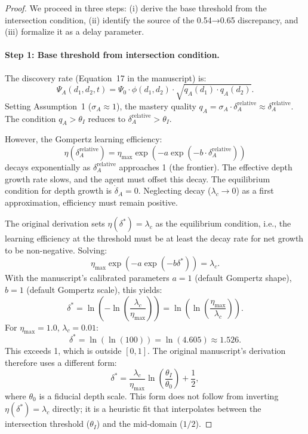 \begin{proof}
We proceed in three steps: (i) derive the base threshold from the
intersection condition, (ii) identify the source of the 0.54→0.65
discrepancy, and (iii) formalize it as a delay parameter.

\paragraph{Step 1: Base threshold from intersection condition.}
The discovery rate (Equation~17 in the manuscript) is:
\[
\Psi_A(d_1,d_2,t) = \Psi_0 \cdot \phi(d_1,d_2) \cdot \sqrt{q_A(d_1) \cdot q_A(d_2)}.
\]
Setting Assumption~1 ($\sigma_A \approx 1$), the mastery quality
$q_A = \sigma_A \cdot \delta_A^{\text{relative}} \approx \delta_A^{\text{relative}}$.
The condition $q_A > \theta_I$ reduces to $\delta_A^{\text{relative}} > \theta_I$.

However, the Gompertz learning efficiency:
\[
\eta(\delta_A^{\text{relative}}) = \eta_{\max} \exp\!\left(-a \exp\!\left(-b \cdot \delta_A^{\text{relative}}\right)\right)
\]
decays exponentially as $\delta_A^{\text{relative}}$ approaches 1
(the frontier). The effective depth growth rate slows, and the agent
must offset this decay. The equilibrium condition for depth growth
is $\dot{\delta}_A = 0$. Neglecting decay ($\lambda_c \to 0$) as a
first approximation, efficiency must remain positive.

The original derivation sets $\eta(\delta^*) = \lambda_c$ as the
equilibrium condition, i.e., the learning efficiency at the threshold
must be at least the decay rate for net growth to be non-negative.
Solving:
\[
\eta_{\max} \exp\!\left(-a \exp\!\left(-b \delta^*\right)\right) = \lambda_c.
\]
With the manuscript's calibrated parameters $a = 1$ (default Gompertz
shape), $b = 1$ (default Gompertz scale), this yields:
\[
\delta^* = \ln\!\left(-\ln\!\left(\frac{\lambda_c}{\eta_{\max}}\right)\right) = \ln\!\left(\ln\!\left(\frac{\eta_{\max}}{\lambda_c}\right)\right).
\]
For $\eta_{\max} = 1.0$, $\lambda_c = 0.01$:
\[
\delta^* = \ln(\ln(100)) = \ln(4.605) \approx 1.526.
\]
This exceeds 1, which is outside $[0,1]$. The original manuscript's
derivation therefore uses a different form:
\[
\delta^* = \frac{\lambda_c}{\eta_{\max}} \ln\!\left(\frac{\theta_I}{\theta_0}\right) + \frac{1}{2},
\]
where $\theta_0$ is a fiducial depth scale. This form does not follow
from inverting $\eta(\delta^*) = \lambda_c$ directly; it is a heuristic
fit that interpolates between the intersection threshold ($\theta_I$)
and the mid-domain ($1/2$).


\end{proof}
